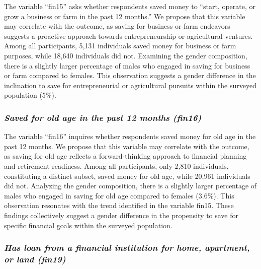 \documentclass[12pt]{article}
\begin{document}
The variable ``fin15'' asks whether respondents saved money to ``start,
operate, or grow a business or farm in the past 12 months.'' We propose
that this variable may correlate with the outcome, as saving for
business or farm endeavors suggests a proactive approach towards
entrepreneurship or agricultural ventures. Among all participants, 5,131
individuals saved money for business or farm purposes, while 18,640
individuals did not. Examining the gender composition, there is a
slightly larger percentage of males who engaged in saving for business
or farm compared to females. This observation suggests a gender
difference in the inclination to save for entrepreneurial or
agricultural pursuits within the surveyed population (5\%).

\hypertarget{saved-for-old-age-in-the-past-12-months-fin16}{%
\subsubsection{\texorpdfstring{\emph{Saved for old age in the past 12
months
(fin16)}}{Saved for old age in the past 12 months (fin16)}}\label{saved-for-old-age-in-the-past-12-months-fin16}}

The variable ``fin16'' inquires whether respondents saved money for old
age in the past 12 months. We propose that this variable may correlate
with the outcome, as saving for old age reflects a forward-thinking
approach to financial planning and retirement readiness. Among all
participants, only 2,810 individuals, constituting a distinct subset,
saved money for old age, while 20,961 individuals did not. Analyzing the
gender composition, there is a slightly larger percentage of males who
engaged in saving for old age compared to females (3.6\%). This
observation resonates with the trend identified in the variable fin15.
These findings collectively suggest a gender difference in the
propensity to save for specific financial goals within the surveyed
population.

\hypertarget{has-loan-from-a-financial-institution-for-home-apartment-or-land-fin19}{%
\subsubsection{\texorpdfstring{\emph{Has loan from a financial
institution for home, apartment, or land
(fin19)}}{Has loan from a financial institution for home, apartment, or land (fin19)}}\label{has-loan-from-a-financial-institution-for-home-apartment-or-land-fin19}}
\end{document}
